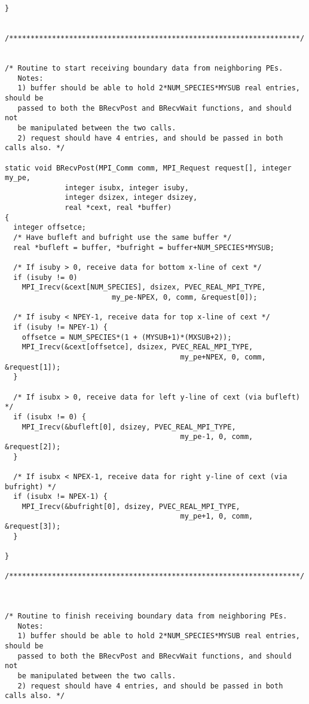 \documentclass[11pt]{article}
\begin{document}
\begin{verbatim}
}


/********************************************************************/

 
/* Routine to start receiving boundary data from neighboring PEs.
   Notes:
   1) buffer should be able to hold 2*NUM_SPECIES*MYSUB real entries, should be
   passed to both the BRecvPost and BRecvWait functions, and should not
   be manipulated between the two calls.
   2) request should have 4 entries, and should be passed in both calls also. */

static void BRecvPost(MPI_Comm comm, MPI_Request request[], integer my_pe,
              integer isubx, integer isuby,
              integer dsizex, integer dsizey,
              real *cext, real *buffer)
{
  integer offsetce;
  /* Have bufleft and bufright use the same buffer */
  real *bufleft = buffer, *bufright = buffer+NUM_SPECIES*MYSUB;

  /* If isuby > 0, receive data for bottom x-line of cext */
  if (isuby != 0)
    MPI_Irecv(&cext[NUM_SPECIES], dsizex, PVEC_REAL_MPI_TYPE,
                         my_pe-NPEX, 0, comm, &request[0]);

  /* If isuby < NPEY-1, receive data for top x-line of cext */
  if (isuby != NPEY-1) {
    offsetce = NUM_SPECIES*(1 + (MYSUB+1)*(MXSUB+2));
    MPI_Irecv(&cext[offsetce], dsizex, PVEC_REAL_MPI_TYPE,
                                         my_pe+NPEX, 0, comm, &request[1]);
  }

  /* If isubx > 0, receive data for left y-line of cext (via bufleft) */
  if (isubx != 0) {
    MPI_Irecv(&bufleft[0], dsizey, PVEC_REAL_MPI_TYPE,
                                         my_pe-1, 0, comm, &request[2]);
  }

  /* If isubx < NPEX-1, receive data for right y-line of cext (via bufright) */
  if (isubx != NPEX-1) {
    MPI_Irecv(&bufright[0], dsizey, PVEC_REAL_MPI_TYPE,
                                         my_pe+1, 0, comm, &request[3]);
  }

}

/********************************************************************/



/* Routine to finish receiving boundary data from neighboring PEs.
   Notes:
   1) buffer should be able to hold 2*NUM_SPECIES*MYSUB real entries, should be
   passed to both the BRecvPost and BRecvWait functions, and should not
   be manipulated between the two calls.
   2) request should have 4 entries, and should be passed in both calls also. */


\end{verbatim}
\end{document}
